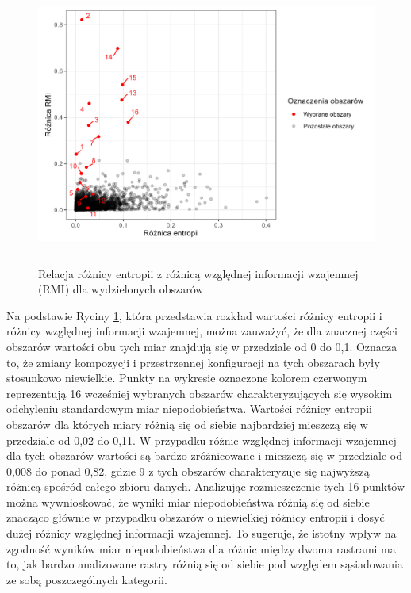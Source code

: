 \documentclass{amuthesis}
\begin{document}
\begin{figure}[t]

{\centering \includegraphics[width=5.20833in,height=3.64583in]{figures/clc_ent_vs_relmutinf.png}

}

\caption{\label{fig-clc_ent_vs_relmutinf}Relacja różnicy entropii z
różnicą względnej informacji wzajemnej (RMI) dla wydzielonych obszarów}

\end{figure}

Na podstawie Ryciny \ref{fig-clc_ent_vs_relmutinf}, która przedstawia
rozkład wartości różnicy entropii i różnicy względnej informacji
wzajemnej, można zauważyć, że dla znacznej części obszarów wartości obu
tych miar znajdują się w przedziale od 0 do 0,1. Oznacza to, że zmiany
kompozycji i przestrzennej konfiguracji na tych obszarach były
stosunkowo niewielkie. Punkty na wykresie oznaczone kolorem czerwonym
reprezentują 16 wcześniej wybranych obszarów charakteryzujących się
wysokim odchyleniu standardowym miar niepodobieństwa. Wartości różnicy
entropii obszarów dla których miary różnią się od siebie najbardziej
mieszczą się w przedziale od 0,02 do 0,11. W przypadku różnic względnej
informacji wzajemnej dla tych obszarów wartości są bardzo zróżnicowane i
mieszczą się w przedziale od 0,008 do ponad 0,82, gdzie 9 z tych
obszarów charakteryzuje się najwyższą różnicą spośród całego zbioru
danych. Analizując rozmieszczenie tych 16 punktów można wywnioskować, że
wyniki miar niepodobieństwa różnią się od siebie znacząco głównie w
przypadku obszarów o niewielkiej różnicy entropii i dosyć dużej różnicy
względnej informacji wzajemnej. To sugeruje, że istotny wpływ na
zgodność wyników miar niepodobieństwa dla różnic między dwoma rastrami
ma to, jak bardzo analizowane rastry różnią się od siebie pod względem
sąsiadowania ze sobą poszczególnych kategorii.
\end{document}
